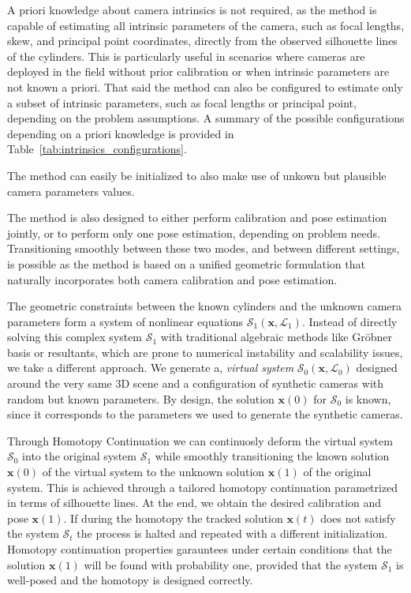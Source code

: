A priori knowledge about camera intrinsics is not required, as the method is capable of estimating all intrinsic parameters of the camera, such as focal lengths, skew, and principal point coordinates, directly from the observed silhouette lines of the cylinders. This is particularly useful in scenarios where cameras are deployed in the field without prior calibration or when intrinsic parameters are not known a priori. That said the method can also be configured to estimate only a subset of intrinsic parameters, such as focal lengths or principal point, depending on the problem assumptions. A summary of the possible configurations depending on a priori knowledge is provided in Table~\ref{tab:intrinsics_configurations}.

The method can easily be initialized to also make use of unkown but plausible camera parameters values.

The method is also designed to either perform calibration and pose estimation jointly, or to perform only one pose estimation, depending on problem needs. Transitioning smoothly between these two modes, and between different settings, is possible as the method is based on a unified geometric formulation that naturally incorporates both camera calibration and pose estimation.

The geometric constraints between the known cylinders and the unknown camera parameters form a system of nonlinear equations $\mathcal{S}_1(\mathbf{x}, \mathcal{L}_1)$. Instead of directly solving this complex system $\mathcal{S}_1$ with traditional algebraic methods like Gröbner basis or resultants, which are prone to numerical instability and scalability issues, we take a different approach. We generate a, \emph{virtual system} $\mathcal{S}_0(\mathbf{x}, \mathcal{L}_0)$ designed around the very same 3D scene and a configuration of synthetic cameras  with random but known parameters. By design, the solution $\mathbf{x}(0)$ for $\mathcal{S}_0$ is known, since it corresponds to the parameters we used to generate the synthetic cameras.

Through Homotopy Continuation we can continuosly deform the virtual system $\mathcal{S}_0$ into the original system $\mathcal{S}_1$ while smoothly transitioning the known solution $\mathbf{x}(0)$ of the virtual system to the unknown solution $\mathbf{x}(1)$ of the original system. This is achieved through a tailored homotopy continuation parametrized in terms of silhouette lines. At the end, we obtain the desired calibration and pose $\mathbf{x}(1)$. If during the homotopy the tracked solution $\mathbf{x}(t)$ does not satisfy the system $\mathcal{S}_t$ the process is halted and repeated with a different initialization. Homotopy continuation properties garauntees under certain conditions that the solution $\mathbf{x}(1)$ will be found with probability one, provided that the system $\mathcal{S}_1$ is well-posed and the homotopy is designed correctly.

